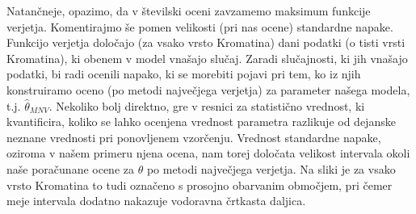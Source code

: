\documentclass{article}
\begin{document}
Natančneje, opazimo, da v številski oceni zavzamemo maksimum funkcije verjetja.
\newline 
Komentirajmo še pomen velikosti (pri nas ocene) standardne napake. Funkcijo verjetja določajo (za vsako vrsto Kromatina) dani podatki (o tisti vrsti Kromatina), ki obenem v model vnašajo slučaj. 
Zaradi slučajnosti, ki jih vnašajo podatki, bi radi ocenili napako, ki se morebiti pojavi pri tem, ko iz njih konstruiramo oceno (po metodi največjega verjetja) za parameter našega modela, t.j. $\hat{\theta}_{MNV}$.
Nekoliko bolj direktno, gre v resnici za statistično vrednost, ki kvantificira, koliko se lahko ocenjena vrednost parametra razlikuje od dejanske neznane vrednosti pri ponovljenem vzorčenju.
Vrednost standardne napake, oziroma v našem primeru njena ocena, nam torej določata velikost intervala okoli naše poračunane ocene za $\theta$ po metodi največjega verjetja. Na sliki je za vsako vrsto Kromatina to tudi označeno s prosojno obarvanim območjem, pri čemer meje intervala dodatno nakazuje vodoravna črtkasta daljica. 
\end{document}
